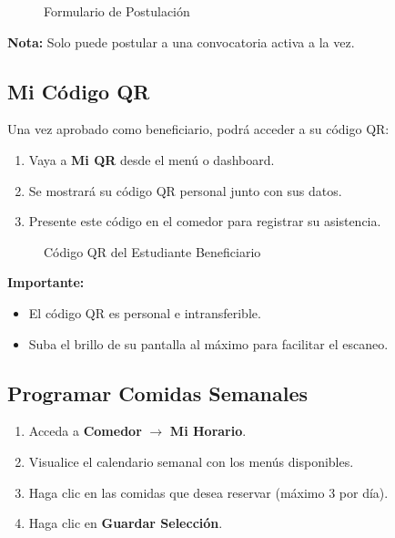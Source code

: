 \documentclass[12pt,a4paper]{article}
\begin{document}
\begin{figure}[h]
    \centering
    \caption{Formulario de Postulación}
    \label{fig:postulacion}
\end{figure}

\textbf{Nota:} Solo puede postular a una convocatoria activa a la vez.

\subsection{Mi Código QR}
Una vez aprobado como beneficiario, podrá acceder a su código QR:

\begin{enumerate}
    \item Vaya a \textbf{Mi QR} desde el menú o dashboard.
    \item Se mostrará su código QR personal junto con sus datos.
    \item Presente este código en el comedor para registrar su asistencia.
\end{enumerate}

\begin{figure}[h]
    \centering
    \caption{Código QR del Estudiante Beneficiario}
    \label{fig:mi_qr}
\end{figure}

\textbf{Importante:}
\begin{itemize}
    \item El código QR es personal e intransferible.
    \item Suba el brillo de su pantalla al máximo para facilitar el escaneo.
\end{itemize}

\subsection{Programar Comidas Semanales}
\begin{enumerate}
    \item Acceda a \textbf{Comedor} $\rightarrow$ \textbf{Mi Horario}.
    \item Visualice el calendario semanal con los menús disponibles.
    \item Haga clic en las comidas que desea reservar (máximo 3 por día).
    \item Haga clic en \textbf{Guardar Selección}.
\end{enumerate}
\end{document}
